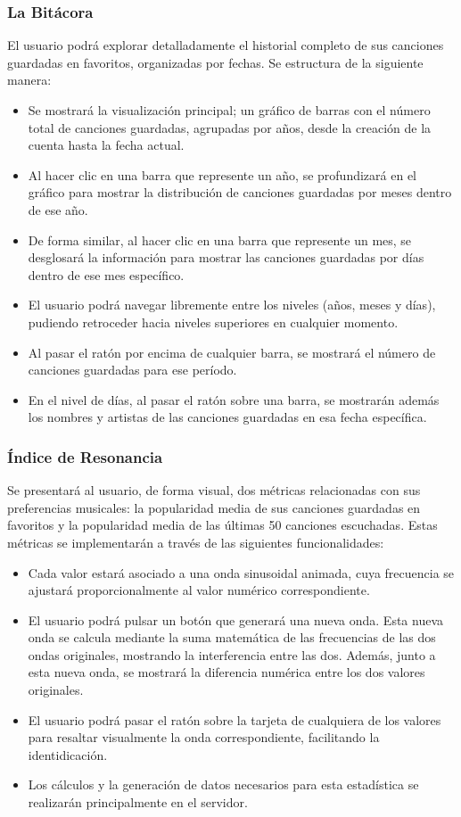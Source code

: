 \subsubsection*{La Bitácora}

El usuario podrá explorar detalladamente el historial completo de sus canciones guardadas en favoritos, organizadas por fechas. Se estructura de la siguiente manera:
\begin{itemize}
    \item Se mostrará la visualización principal; un gráfico de barras con el número total de canciones guardadas, agrupadas por años, desde la creación de la cuenta hasta la fecha actual.
    \item Al hacer clic en una barra que represente un año, se profundizará en el gráfico para mostrar la distribución de canciones guardadas por meses dentro de ese año.
    \item De forma similar, al hacer clic en una barra que represente un mes, se desglosará la información para mostrar las canciones guardadas por días dentro de ese mes específico.
    \item El usuario podrá navegar libremente entre los niveles (años, meses y días), pudiendo retroceder hacia niveles superiores en cualquier momento.
    \item Al pasar el ratón por encima de cualquier barra, se mostrará el número de canciones guardadas para ese período.
    \item En el nivel de días, al pasar el ratón sobre una barra, se mostrarán además los nombres y artistas de las canciones guardadas en esa fecha específica.
\end{itemize}


\subsubsection*{Índice de Resonancia}

Se presentará al usuario, de forma visual, dos métricas relacionadas con sus preferencias musicales: la popularidad media de sus canciones guardadas en favoritos y la popularidad media de las últimas 50 canciones escuchadas. Estas métricas se implementarán a través de las siguientes funcionalidades:
\begin{itemize}
    \item Cada valor estará asociado a una onda sinusoidal animada, cuya frecuencia se ajustará proporcionalmente al valor numérico correspondiente.
    \item El usuario podrá pulsar un botón que generará una nueva onda. Esta nueva onda se calcula mediante la suma matemática de las frecuencias de las dos ondas originales, mostrando la interferencia entre las dos. Además, junto a esta nueva onda, se mostrará la diferencia numérica entre los dos valores originales.
    \item El usuario podrá pasar el ratón sobre la tarjeta de cualquiera de los valores para resaltar visualmente la onda correspondiente, facilitando la identidicación.
    \item Los cálculos y la generación de datos necesarios para esta estadística se realizarán principalmente en el servidor.
\end{itemize}

